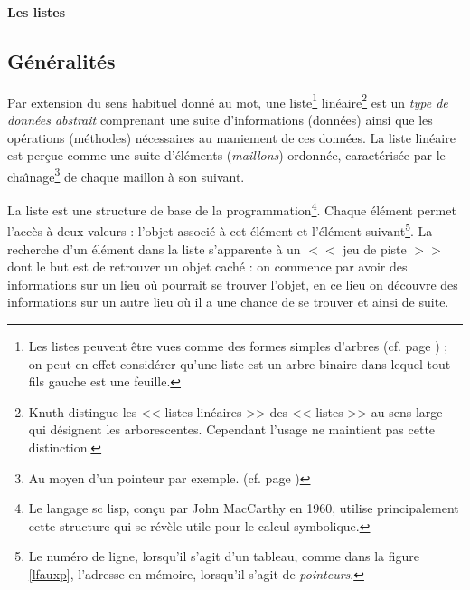 \centerline{\Large\bf Les listes}
 
 \noindent\hrulefill  
\begin{multicols}{2}
\section*{G\'en\'eralit\'es}
  
  Par extension du sens habituel donn\'e au mot, 
  une liste\footnote{Les listes peuvent \^etre vues comme des formes
  simples d'arbres (cf. page \pageref{Arbre}) ; on peut en effet consid\'erer
  qu'une liste est un arbre binaire dans lequel tout fils gauche est une
  feuille.} lin\'eaire\footnote{Knuth distingue les << listes lin\'eaires >>
  des << listes >> au sens large qui d\'esignent 
  les arborescentes. Cependant l'usage ne maintient pas cette distinction.}
  est un {\em type de donn\'ees abstrait} comprenant une suite
  d'informations (donn\'ees) ainsi que les op\'erations (m\'ethodes)
  n\'ecessaires au maniement de ces donn\'ees.  
  La liste lin\'eaire est per\c cue comme une suite d'\'el\'ements ({\it maillons})
  ordonn\'ee, caract\'eris\'ee par le cha\^\i nage\footnote{Au moyen d'un pointeur
  par exemple. (cf. page \pageref{pointeur})} de chaque maillon \`a son suivant.

  La liste est une structure de base de la programmation\footnote{Le langage
{sc lisp}, con\c cu par John MacCarthy en 1960, utilise principalement cette
structure qui se r\'ev\`ele utile pour le calcul symbolique.}. Chaque \'el\'ement
permet l'acc\`es \`a deux valeurs : l'objet associ\'e \`a cet \'el\'ement et l'\'el\'ement
suivant\footnote{Le num\'ero de ligne, lorsqu'il s'agit
d'un tableau, comme dans la figure \ref{lfauxp}, l'adresse en
m\'emoire, lorsqu'il s'agit de {\em pointeurs}.}. La recherche d'un \'el\'ement dans
la liste s'apparente \`a un $<<$ jeu de piste $>>$ dont le but est de retrouver un
objet cach\'e : on commence par avoir des informations sur un lieu o\`u pourrait
se trouver l'objet, en ce lieu on d\'ecouvre des informations sur un autre lieu
o\`u il a une chance de se trouver et ainsi de suite.
  

\end{multicols}
